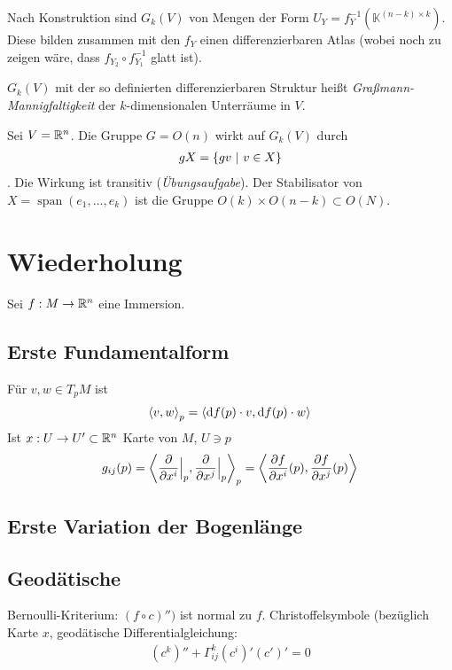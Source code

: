 \documentclass{skript}
\begin{document}
Nach Konstruktion sind $G_k(V)$ von Mengen der Form $U_Y =
f_Y^{-1}(\mathbb{K}^{(n-k)\times k})$. Diese bilden zusammen mit den $f_Y$
einen differenzierbaren Atlas (wobei noch zu zeigen wäre, dass $f_{Y_2}\circ
f_{Y_1}^{-1}$ glatt ist).

$G_k(V)$ mit der so definierten differenzierbaren Struktur heißt
\emph{Graßmann-Mannigfaltigkeit} der $k$-dimensionalen Unterräume in $V$.

\begin{bem}
  Sei $V=\mathbb{R}^n$. Die Gruppe $G = O(n)$ wirkt auf $G_k(V)$ durch
  \begin{align*}
    gX = \mdef[gv]{v\in X}
  \end{align*}.
  Die Wirkung ist transitiv (\emph{Übungsaufgabe}). Der Stabilisator von
  $X=\operatorname{span}(e_1,\ldots,e_k)$ ist die Gruppe $O(k)\times O(n-k)
  \subset O(N)$.
\end{bem}

\section{Wiederholung}

Sei $f:M\to\mathbb{R}^n$ eine Immersion.

\subsection{Erste Fundamentalform}
Für $v,w\in T_pM$ ist
\begin{align*}
  \sprod[p]{v,w} = \sprod{\d f(p)\cdot v, \d f(p)\cdot w}
\end{align*}
Ist $x:U\to U' \subset \mathbb{R}^n$ Karte von $M$, $U\ni p$
\begin{align*}
  g_{ij}(p) = \sprod[p]{\frac{\partial}{\partial x^i}\Big|_p,
  \frac{\partial}{\partial x^j}\Big|_p} = \sprod{\frac{\partial f}{\partial
  x^i}(p), \frac{\partial f}{\partial x^j}(p)}
\end{align*}

\subsection{Erste Variation der Bogenlänge}
\subsection{Geodätische}
Bernoulli-Kriterium: $(f\circ c)'')$ ist normal zu $f$.
Christoffelsymbole (bezüglich Karte $x$, geodätische Differentialgleichung:
\begin{align*}
  (c^k)'' + \Gamma^k_{ij}(c^i)'(c')' = 0
\end{align*}
\end{document}
